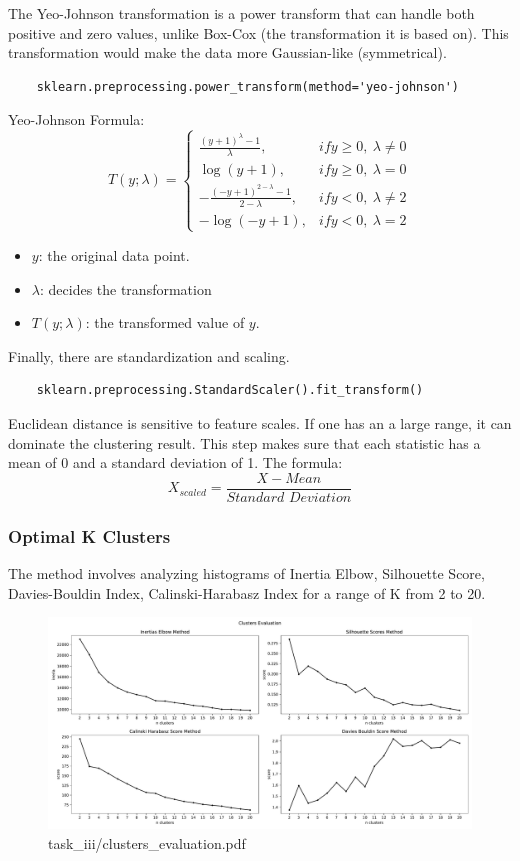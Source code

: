 \documentclass{report}
\begin{document}
\newpage
\noindent
The Yeo-Johnson transformation is a power transform that can handle both positive and zero values, 
unlike Box-Cox (the transformation it is based on). This transformation would make the data more 
Gaussian-like (symmetrical).
\begin{verbatim}
    sklearn.preprocessing.power_transform(method='yeo-johnson')
\end{verbatim}
Yeo-Johnson Formula: 
\[ %
T(y; \lambda) =
\left\{
\begin{array}{ll}
\frac{(y + 1)^\lambda - 1}{\lambda}, & if y \geq 0,\ \lambda \ne 0 \\[6pt]
\log(y + 1), & if y \geq 0,\ \lambda = 0 \\[6pt]
- \frac{(-y + 1)^{2 - \lambda} - 1}{2 - \lambda}, & if y < 0,\ \lambda \ne 2 \\[6pt]
- \log(-y + 1), & if y < 0,\ \lambda = 2
\end{array}
\right.
\]
\begin{itemize}
    \item \( y \): the original data point.
    \item \( \lambda \): decides the transformation
    \item \( T(y; \lambda) \): the transformed value of \( y \).
\end{itemize}

\noindent
Finally, there are standardization and scaling.
\begin{verbatim}
    sklearn.preprocessing.StandardScaler().fit_transform()
\end{verbatim}
Euclidean distance is sensitive to feature scales. If one has an a large range, it can dominate the 
clustering result. This step makes sure that each statistic has a mean of 0 and a standard deviation 
of 1. The formula:
\[ X_{scaled} = \frac{X - Mean}{\textit{Standard Deviation}} \]

\subsubsection{Optimal K Clusters}
The method involves analyzing histograms of Inertia Elbow, Silhouette Score, Davies-Bouldin Index,
Calinski-Harabasz Index for a range of K from 2 to 20.
\begin{figure}[ht!]
    \centering
    \includegraphics[width=\textwidth]{../output/task_iii/clusters_evaluation.pdf}
    \caption{task\_iii/clusters\_evaluation.pdf}
\end{figure}
\end{document}
